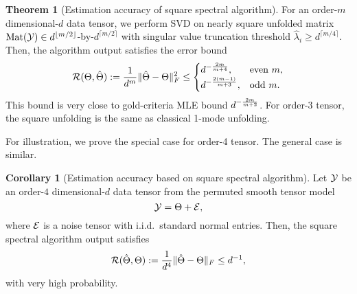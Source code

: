 \documentclass[10pt]{article}
\theoremstyle{definition}
\newtheorem{thm}{Theorem}[section]
\newtheorem{cor}{Corollary}[section]
\theoremstyle{definition}
\def\Mat{\text{Mat}}
\theoremstyle{definition}
\begin{document}
\begin{thm}[Estimation accuracy of square spectral algorithm] For an order-$m$ dimensional-$d$ data tensor, we perform SVD on nearly square unfolded matrix $\Mat(\tY)\in d^{\lfloor m/2\rfloor}$-by-$d^{\lceil m/2\rceil}$ with singular value truncation threshold $\hat \lambda_i \geq d^{\lceil m/4\rceil}$. %
Then, the algorithm output satisfies the error bound
\begin{align}
\mathcal{R}(\Theta, \hat \Theta):={1\over d^m}\lVert\hat \Theta- \Theta\rVert_F^2\leq
\begin{cases}
d^{-{2m\over m+4}}, & \text{even $m$},\\
d^{-{2(m-1)\over m+3}}, & \text{odd $m$}.
\end{cases}
\end{align}
This bound is very close to gold-criteria MLE bound $d^{-{2m\over m+2}}$. For order-$3$ tensor, the square unfolding is the same as classical 1-mode unfolding. 
\end{thm}
For illustration, we prove the special case for order-4 tensor. The general case is similar. 
\begin{cor}[Estimation accuracy based on square spectral algorithm]\label{thm:main}Let $\mathcal{Y}$ be an order-$4$ dimensional-$d$ data tensor from the permuted smooth tensor model
\[
\mathcal{Y}=\Theta+\mathcal{E},
\]
where $\mathcal{E}$ is a noise tensor with i.i.d.\ standard normal entries. Then, the square spectral algorithm output satisfies
\[
\mathcal{R}(\hat \Theta, \Theta):={1\over d^4}\lVert\hat \Theta-\Theta\rVert_F\leq d^{-1},
\]
with very high probability.
\end{cor}
\end{document}

